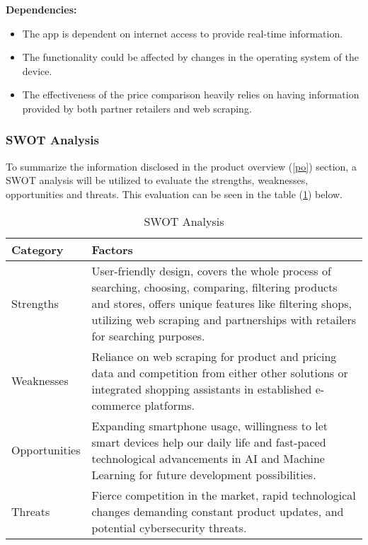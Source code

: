 \textbf{Dependencies:}

\begin{itemize}
	\item The app is dependent on internet access to provide real-time information.
	\item The functionality could be affected by changes in the operating system of the device.
	\item The effectiveness of the price comparison heavily relies on having information provided by both partner retailers and web scraping.
\end{itemize}

\subsubsection{SWOT Analysis}

To summarize the information disclosed in the product overview (\ref{po}) section, a SWOT analysis will be utilized to evaluate the strengths, weaknesses, opportunities and threats. This evaluation can be seen in the table (\ref{swot}) below.

\begin{table}[ht]
	\centering
	\begin{tabularx}{\textwidth}{|l|X|}
		\hline
		\textbf{Category} & \textbf{Factors} \\ 
		\hline
		Strengths & User-friendly design, covers the whole process of searching, choosing, comparing, filtering products and stores, offers unique features like filtering shops, utilizing web scraping and partnerships with retailers for searching purposes. \\ 
		\hline
		Weaknesses & Reliance on web scraping for product and pricing data and competition from either other solutions or integrated shopping assistants in established e-commerce platforms. \\ 
		\hline
		Opportunities & Expanding smartphone usage, willingness to let smart devices help our daily life and fast-paced technological advancements in AI and Machine Learning for future development possibilities. \\ 
		\hline
		Threats & Fierce competition in the market, rapid technological changes demanding constant product updates, and potential cybersecurity threats. \\ 
		\hline
	\end{tabularx}
	\caption{SWOT Analysis}
	\label{swot}
\end{table}

\pagebreak

